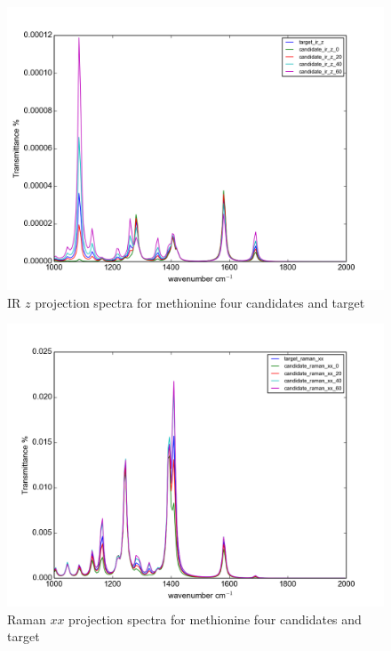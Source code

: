 \begin{figure}[!ht]
\centering
\includegraphics[scale=0.5]{Figures/Met_candidates_plotting_ir_z.png}
\caption{IR $z$ projection spectra for methionine four candidates and target} \label{fig:2.3}
\end{figure}

\begin{figure}[!ht]
\centering
\includegraphics[scale=0.5]{Figures/Met_candidates_plotting_raman_xx.png}
\caption{Raman $xx$ projection spectra for methionine four candidates and target} \label{fig:2.4}
\end{figure}

